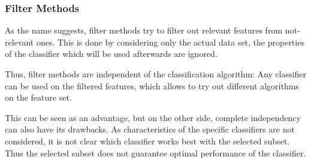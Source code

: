 \subsubsection{Filter Methods}
\label{sec:methods.flat.filter}


As the name suggests, filter methods try to filter out relevant features from
not-relevant ones. 
This is done by considering only the actual data set, 
the properties of the classifier which will be used afterwards are ignored.
 
Thus, filter methods are independent of the classification algorithm: Any
classifier can be used on the filtered features, 
which allows to try out different algorithms on the feature set.
 
This can be seen as an advantage, but on the other side, 
complete independency can also have its drawbacks. 
As characteristics of the specific classifiers are not considered, 
it is not clear which classifier works best with the selected subset. 
Thus the selected subset does not guarantee optimal performance of the classifier.




